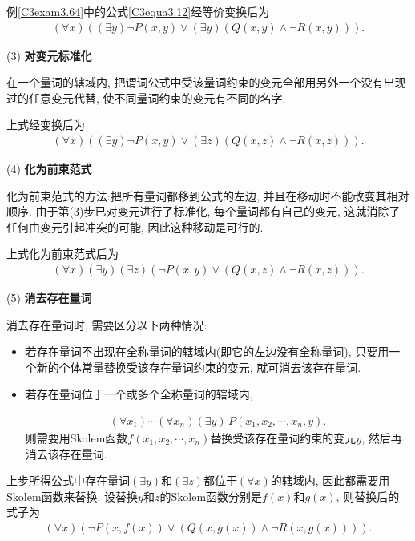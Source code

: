 \begin{example}
例\ref{C3exam3.64}中的公式\ref{C3equa3.12}经等价变换后为
\begin{align}
  (\forall x)((\exists  y)\neg P(x, y)\vee (\exists  y)(Q(x, y) \wedge \neg R(x, y))).
\end{align}
\end{example}

(3) \textbf{对变元标准化}

在一个量词的辖域内, 把谓词公式中受该量词约束的变元全部用另外一个没有出现过的任意变元代替, 使不同量词约束的变元有不同的名字.
\begin{example}
上式经变换后为
\begin{align}
  (\forall x)((\exists  y)\neg P(x, y)\vee (\exists  z)( Q(x, z) \wedge \neg R(x, z))).
\end{align}
\end{example}

(4) \textbf{化为前束范式}

化为前束范式的方法:把所有量词都移到公式的左边, 并且在移动时不能改变其相对顺序. 由于第(3)步已对变元进行了标准化, 每个量词都有自己的变元, 这就消除了任何由变元引起冲突的可能, 因此这种移动是可行的.

\begin{example}
上式化为前束范式后为
\begin{align}
  (\forall x)(\exists  y) (\exists  z)(\neg P(x, y)\vee ( Q(x, z) \wedge \neg R(x, z))).
\end{align}
\end{example}

(5) \textbf{消去存在量词}

消去存在量词时, 需要区分以下两种情况:
\begin{itemize}
\item 若存在量词不出现在全称量词的辖域内(即它的左边没有全称量词), 只要用一个新的个体常量替换受该存在量词约束的变元, 就可消去该存在量词.

\item 若存在量词位于一个或多个全称量词的辖域内, 
\begin{example}
\begin{align}
    (\forall x_1)\cdots(\forall x_n) (\exists  y)\,P(x_1, x_2 ,\cdots, x_n ,y).
\end{align}
则需要用Skolem函数$f(x_1,x_2,\cdots, x_n)$替换受该存在量词约束的变元$y$, 然后再消去该存在量词.  
\end{example}
\end{itemize}
\begin{example}
    上步所得公式中存在量词$(\exists  y)$和$(\exists  z)$都位于$(\forall x)$的辖域内, 因此都需要用Skolem函数来替换. 设替换$y$和$z$的Skolem函数分别是$f(x)$和$g(x)$, 则替换后的式子为
\begin{align}
  (\forall x)(\neg P(x,f(x))\vee (Q(x,g(x))\wedge \neg R(x,g(x)))).
\end{align}
\end{example}

